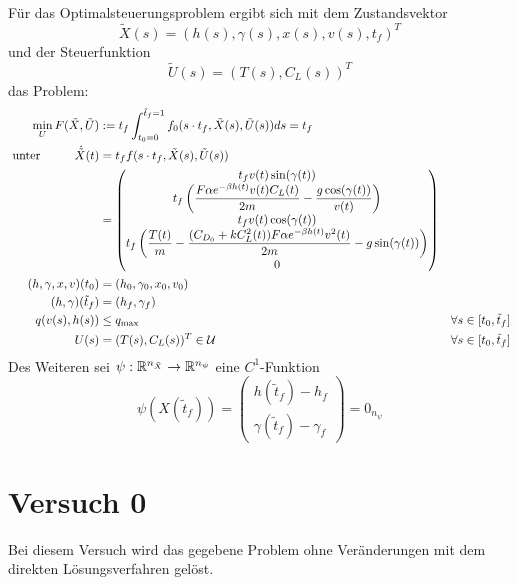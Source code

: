 \begin{problem}\label{prob:MaxRFEndzeit}
Für das Optimalsteuerungsproblem ergibt sich mit dem Zustandsvektor
\[\tilde{X}(s) = (h(s),\gamma(s),x(s),v(s),t_f)^T\]
und der Steuerfunktion
\[\tilde{U}(s) = (T(s),C_L(s))^T\]
das Problem:
\begin{align*}
\min_{U} F(\tilde{X},\tilde{U}) &:= t_f \int^{\tilde{t}_f = 1}_{t_0 = 0} f_0(s \cdot t_f,\tilde{X}(s),\tilde{U}(s)) ds = t_f & & \\\
\text{unter} \hspace{10mm} \dot{\tilde{X}}(t) &= t_f f(s \cdot t_f,\tilde{X}(s),\tilde{U}(s))\\\
&= \begin{pmatrix}
t_f v(t) \sin(\gamma(t)) \\ 
t_f \left( \dfrac{F \alpha e^{-\beta h(t)} v(t) C_L(t)}{2m} - \dfrac{g \cos(\gamma(t))}{v(t)} \right) \\ 
t_f v(t) \cos(\gamma(t)) \\ 
t_f \left( \dfrac{T(t)}{m} - \dfrac{(C_{D_0} + k C_L^2(t)) F \alpha e^{-\beta h(t)} v^2(t)}{2m} - g \sin(\gamma(t)) \right) \\
0
\end{pmatrix} & & \\\
(h,\gamma,x,v)(t_0) &= (h_0,\gamma_0,x_0,v_0) & & \\\
(h,\gamma)(\tilde{t}_f) &= (h_f,\gamma_f) & & \\\
q(v(s),h(s)) &\leq q_{\max} & & \forall s \in [t_0,\tilde{t}_f]\\\
U(s) &= (T(s),C_L(s))^T \in \mathcal{U} & & \forall s \in [t_0,\tilde{t}_f]
\end{align*}
Des Weiteren sei $\psi : \mathbb{R}^{n_{\tilde{X}}} \to \mathbb{R}^{n_{\psi}}$ eine $C^1$-Funktion
\[\psi(X(\tilde{t}_f)) = 
\begin{pmatrix}
    h(\tilde{t}_f) - h_f \\ 
    \gamma(\tilde{t}_f) - \gamma_f
\end{pmatrix} = 0_{n_{\psi}}\]
\end{problem}










\section{Versuch 0}\label{kap:Versuch0_OptTf}
Bei diesem Versuch wird das gegebene Problem ohne Veränderungen mit dem direkten Lösungsverfahren gelöst.

